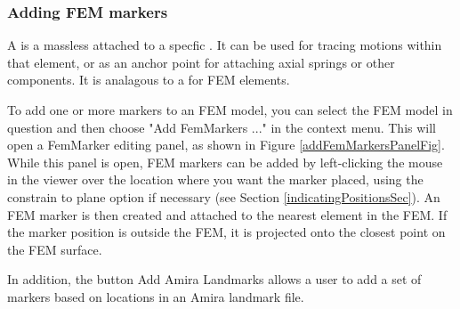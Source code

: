 \documentclass{article}
\begin{document}
\subsubsection{Adding FEM markers}
\label{addingFemMarkersSec}

A  is a massless 
 attached to a
specfic . 
It can be used for tracing motions within that element,
or as an anchor point for attaching axial
springs or other components. It is analagous to 
a  for
FEM elements.

To add one or more markers to an FEM model, you can select the FEM
model in question and then choose {\sf "Add FemMarkers ..."} in the context
menu. This will open a FemMarker editing panel, as shown in
Figure \ref{addFemMarkersPanelFig}. While this panel is open, FEM markers can be
added by left-clicking the mouse in the viewer over the location where
you want the marker placed, using the {\sf constrain to plane} option if
necessary (see Section \ref{indicatingPositionsSec}). An FEM marker is then created
and attached to the nearest element in the FEM. If the marker position
is outside the FEM, it is projected onto the closest point on the FEM
surface.

In addition, the button {\sf Add Amira Landmarks} allows a user to add a
set of markers based on locations in an Amira landmark file.
\end{document}
